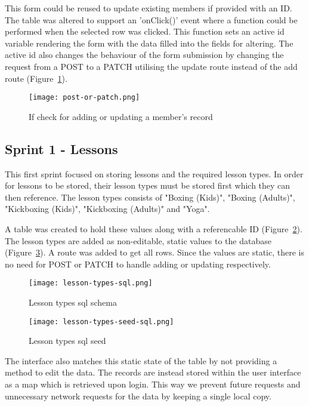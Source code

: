 This form could be reused to update existing members if provided with an ID. The table was altered to support an 'onClick()' event where a function could be performed when the selected row was clicked. This function sets an active id variable rendering the form with the data filled into the fields for altering. The active id also changes the behaviour of the form submission by changing the request from a POST to a PATCH utilising the update route instead of the add route (Figure~\ref{fig:members-patch-post}).

\begin{figure}[ht!]
    \centerline{\texttt{[image: post-or-patch.png]}}
    \caption{If check for adding or updating a member's record}
    \label{fig:members-patch-post}
\end{figure}


\subsection{Sprint 1 - Lessons}

This first sprint focused on storing lessons and the required lesson types. In order for lessons to be stored, their lesson types must be stored first which they can then reference. The lesson types consists of "Boxing (Kids)", "Boxing (Adults)", "Kickboxing (Kids)", "Kickboxing (Adults)" and "Yoga".

A table was created to hold these values along with a referencable ID (Figure~\ref{fig:lesson-types-schema-sql}). The lesson types are added as non-editable, static values to the database (Figure~\ref{fig:lesson-types-seed-sql}). A route was added to get all rows. Since the values are static, there is no need for POST or PATCH to handle adding or updating respectively.

\begin{figure}[ht!]
    \centerline{\texttt{[image: lesson-types-sql.png]}}
    \caption{Lesson types sql schema}
    \label{fig:lesson-types-schema-sql}
\end{figure}

\begin{figure}[ht!]
    \centerline{\texttt{[image: lesson-types-seed-sql.png]}}
    \caption{Lesson types sql seed}
    \label{fig:lesson-types-seed-sql}
\end{figure}

The interface also matches this static state of the table by not providing a method to edit the data. The records are instead stored within the user interface as a map which is retrieved upon login. This way we prevent future requests and unnecessary network requests for the data by keeping a single local copy.

